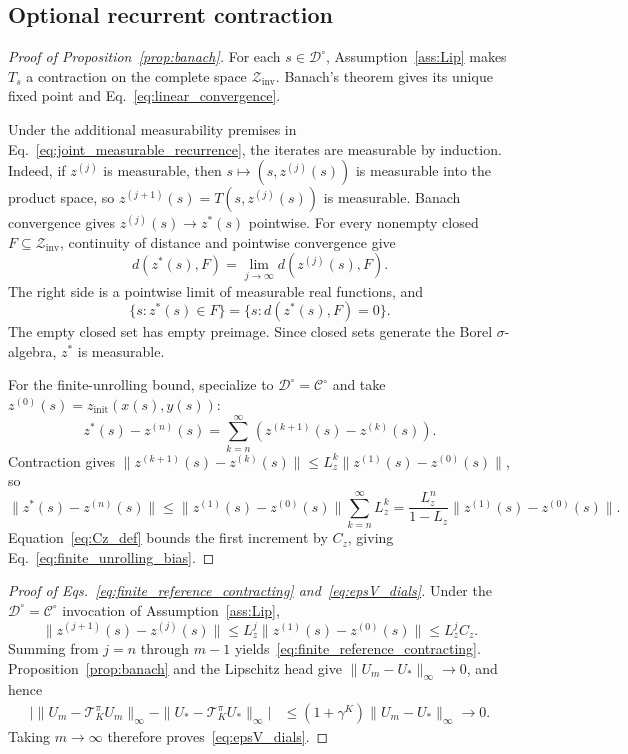 \documentclass{article}
\theoremstyle{plain}
\theoremstyle{definition}
\theoremstyle{remark}
\begin{document}
\subsection{Optional recurrent contraction}
\label{app:proof_banach}

\begin{proof}[Proof of Proposition~\ref{prop:banach}]
For each $s\in\mathcal D^\circ$, Assumption~\ref{ass:Lip} makes $T_s$ a
contraction on the complete space $\mathcal Z_{\mathrm{inv}}$.
Banach's theorem gives its unique fixed point and
Eq.~\eqref{eq:linear_convergence}.

Under the additional measurability premises in
Eq.~\eqref{eq:joint_measurable_recurrence}, the iterates are measurable by
induction. Indeed, if $z^{(j)}$ is measurable, then
$s\mapsto(s,z^{(j)}(s))$ is measurable into the product space, so
$z^{(j+1)}(s)=T(s,z^{(j)}(s))$ is measurable. Banach convergence gives
$z^{(j)}(s)\to z^*(s)$ pointwise. For every nonempty closed
$F\subseteq\mathcal Z_{\mathrm{inv}}$, continuity of distance and pointwise
convergence give
\[
d(z^*(s),F)=\lim_{j\to\infty}d(z^{(j)}(s),F).
\]
The right side is a pointwise limit of measurable real functions, and
\[
\{s:z^*(s)\in F\}=\{s:d(z^*(s),F)=0\}.
\]
The empty closed set has empty preimage. Since closed sets generate the Borel
$\sigma$-algebra, $z^*$ is measurable.

For the finite-unrolling bound, specialize to
$\mathcal D^\circ=\mathcal C^\circ$ and take
$z^{(0)}(s)=z_{\mathrm{init}}(x(s),y(s))$:
\[
z^*(s) - z^{(n)}(s)
= \sum_{k=n}^{\infty}(z^{(k+1)}(s) - z^{(k)}(s)).
\]
Contraction gives
$\|z^{(k+1)}(s)-z^{(k)}(s)\|
\le L_z^k\|z^{(1)}(s)-z^{(0)}(s)\|$, so
\[
\|z^*(s)-z^{(n)}(s)\|
\le \|z^{(1)}(s)-z^{(0)}(s)\| \sum_{k=n}^{\infty} L_z^k
= \frac{L_z^n}{1-L_z}\|z^{(1)}(s)-z^{(0)}(s)\|.
\]
Equation~\eqref{eq:Cz_def} bounds the first increment by $C_z$, giving
Eq.~\eqref{eq:finite_unrolling_bias}.
\end{proof}


\begin{proof}[Proof of Eqs.~\eqref{eq:finite_reference_contracting} and~\eqref{eq:epsV_dials}]
Under the $\mathcal D^\circ=\mathcal C^\circ$ invocation of
Assumption~\ref{ass:Lip},
\[
\|z^{(j+1)}(s)-z^{(j)}(s)\|
\le L_z^j\|z^{(1)}(s)-z^{(0)}(s)\|
\le L_z^j C_z.
\]
Summing from $j=n$ through $m-1$ yields~\eqref{eq:finite_reference_contracting}. Proposition~\ref{prop:banach} and the Lipschitz head give $\|U_m-U_*\|_\infty\to0$, and hence
\begin{align*}
\big|\|U_m-\mathcal T_K^\pi U_m\|_\infty
-\|U_*-\mathcal T_K^\pi U_*\|_\infty\big|
&\le (1+\gamma^K)\|U_m-U_*\|_\infty \to 0.
\end{align*}
Taking $m\to\infty$ therefore proves~\eqref{eq:epsV_dials}.
\end{proof}
\end{document}
